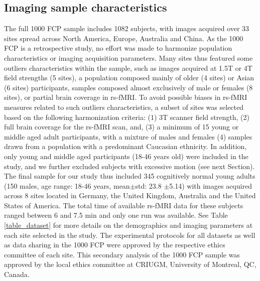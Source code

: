 \documentclass[authoryear]{elsarticle}
\begin{document}
\subsection{Imaging sample characteristics}
The full 1000 FCP sample includes 1082 subjects, with images acquired over 33 sites spread across North America, Europe, Australia and China. As the 1000 FCP is a retrospective study, no effort was made to harmonize population characteristics or imaging acquisition parameters. Many sites thus featured some outliers characteristics within the sample, such as images acquired at 1.5T or 4T field strengths (5 sites), a population composed mainly of older (4 sites) or Asian (6 sites) participants, samples composed almost exclusively of male or females (8 sites), or partial brain coverage in rs-fMRI. To avoid possible biases in rs-fMRI measures related to such outliers characteristics, a subset of sites was selected based on the following harmonization criteria: (1) 3T scanner field strength, (2) full brain coverage for the rs-fMRI scan, and, (3) a minimum of 15 young or middle aged adult participants, with a mixture of males and females (4) samples drawn from a population with a predominant Caucasian ethnicity. In addition, only young and middle aged participants (18-46 years old) were included in the study, and we further excluded subjects with excessive motion (see next Section). The final sample for our study thus included 345 cognitively normal young adults (150 males, age range: 18-46 years, mean$\pm$std: 23.8 $\pm$5.14) with images acquired across 8 sites located in Germany, the United Kingdom, Australia and the United States of America. The total time of available rs-fMRI data for these subjects ranged between 6 and 7.5 min and only one run was available. See Table \ref{table_dataset} for more details on the demographics and imaging parameters at each site selected in the study.  The experimental protocols for all datasets as well as data sharing in the 1000 FCP were approved by the respective ethics committee of each site. This secondary analysis of the 1000 FCP sample was approved by the local ethics committee at CRIUGM, University of Montreal, QC, Canada.

 
\end{document}
